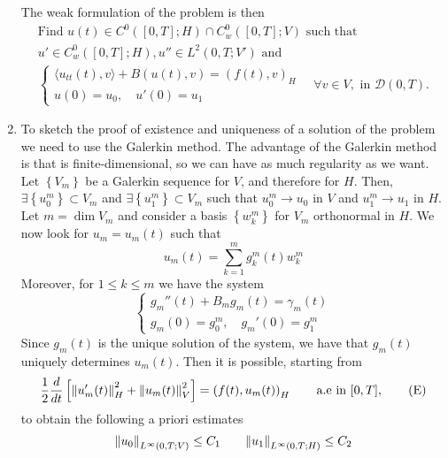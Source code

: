 \begin{enumerate}
          The weak formulation of the problem is then
          \[
              \begin{split}
                  \text{Find } u(t) \in C^0([0, T]; H) \cap C_w^0([0, T]; V) \text{ such that } \\
                  u' \in C_w^0([0, T]; H), u'' \in L^2(0, T; V') \text{ and }                   \\
                  \begin{cases}
                      \langle u_{tt}(t), v \rangle + B(u(t), v) = (f(t), v)_H \\
                      u(0) = u_0, \quad u'(0) = u_1
                  \end{cases}\quad \forall v \in V, \text{ in } \mathcal{D}(0, T).
              \end{split}
          \]
    \item To sketch the proof of existence and uniqueness of a solution of the problem we
          need to use the Galerkin method. The advantage of the Galerkin method is that
          is finite-dimensional, so we can have as much regularity as we want. Let
          \(\left\{V_m\right\}\) be a Galerkin sequence for \(V\), and therefore for
          \(H\). Then, \(\exists \left\{u_0^m\right\} \subset V_m\) and \(\exists
          \left\{u_1^m\right\} \subset V_m\) such that \(u_0^m \to u_0\) in \(V\) and
          \(u_1^m \to u_1\) in \(H\). Let \(m = \dim V_m\) and consider a basis
          \(\left\{w_k^m\right\}\) for \(V_m\) orthonormal in \(H\). We now look for
          \(u_m = u_m(t)\) such that
          \[
              u_m(t) = \sum_{k=1}^m g_k^m(t) w_k^m
          \]
          Moreover, for \(1 \leq k \leq m\) we have the system
          \[
              \begin{cases}
                  g_m''(t) + B_m g_m(t) = \gamma_m(t) \\
                  g_m(0) = g_0^m, \quad g_m'(0) = g_1^m
              \end{cases}
          \]
          Since \(g_m(t)\) is the unique solution of the system, we have that \(g_m(t)\)
          uniquely determines \(u_m(t)\). Then it is possible, starting from
          \[
              \frac{1}{2}\frac{d}{dt} \left[\norm{u_m'(t)}_H^2 + \norm{u_m(t)}_V^2\right] = \left(f(t), u_m(t)\right)_H \qquad \text{a.e in } [0, T],
              \tag*{(E)}
          \]
          to obtain the following a priori estimates
          \[
              \norm{u_0}_{L^\infty(0, T; V)} \leq C_1 \qquad \norm{u_1}_{L^\infty(0, T; H)} \leq C_2
\]
\end{enumerate}
